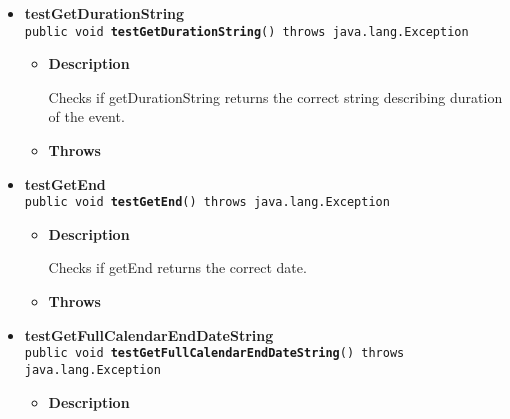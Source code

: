 \documentclass[11pt,a4paper]{report}
\begin{document}
{{{\begin{itemize}
{\begin{itemize}
{Checks if getDescription returns the correct description.
}
\item{{\bf  Throws}
}%
\end{itemize}
}%
\item{ 
{\bf  testGetDurationString}\\
\texttt{public void\ {\bf  testGetDurationString}() throws java.lang.Exception
\label{is.mpg.ruglan.test.CalEventTest.testGetDurationString()}}%
\begin{itemize}
\item{
{\bf  Description}

Checks if getDurationString returns the correct string describing duration of the event.
}
\item{{\bf  Throws}
}%
\end{itemize}
}%
\item{ 
{\bf  testGetEnd}\\
\texttt{public void\ {\bf  testGetEnd}() throws java.lang.Exception
\label{is.mpg.ruglan.test.CalEventTest.testGetEnd()}}%
\begin{itemize}
\item{
{\bf  Description}

Checks if getEnd returns the correct date.
}
\item{{\bf  Throws}
}%
\end{itemize}
}%
\item{ 
{\bf  testGetFullCalendarEndDateString}\\
\texttt{public void\ {\bf  testGetFullCalendarEndDateString}() throws java.lang.Exception
\label{is.mpg.ruglan.test.CalEventTest.testGetFullCalendarEndDateString()}}%
\begin{itemize}
\item{
{\bf  Description}

}
\end{itemize}}
\end{itemize}}}}
\end{document}

